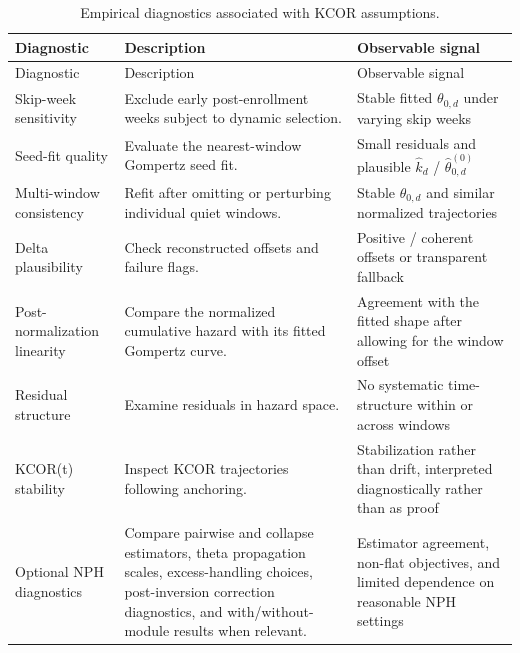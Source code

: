 \documentclass[
]{article}
\begin{document}
\begin{longtable}[]{@{}
  >{\raggedright\arraybackslash}p{}
  >{\raggedright\arraybackslash}p{}
  >{\raggedright\arraybackslash}p{}@{}}
\caption{Empirical diagnostics associated with KCOR assumptions.}\label{tbl:si_diagnostics}\tabularnewline
\toprule\noalign{}
\begin{minipage}[b]{\linewidth}\raggedright
Diagnostic
\end{minipage} & \begin{minipage}[b]{\linewidth}\raggedright
Description
\end{minipage} & \begin{minipage}[b]{\linewidth}\raggedright
Observable signal
\end{minipage} \\
\midrule\noalign{}
\endfirsthead
\toprule\noalign{}
\begin{minipage}[b]{\linewidth}\raggedright
Diagnostic
\end{minipage} & \begin{minipage}[b]{\linewidth}\raggedright
Description
\end{minipage} & \begin{minipage}[b]{\linewidth}\raggedright
Observable signal
\end{minipage} \\
\midrule\noalign{}
\endhead
\bottomrule\noalign{}
\endlastfoot
Skip-week sensitivity & Exclude early post-enrollment weeks subject to dynamic selection. & Stable fitted \(\theta_{0,d}\) under varying skip weeks \\
Seed-fit quality & Evaluate the nearest-window Gompertz seed fit. & Small residuals and plausible \(\hat{k}_d\) / \(\hat{\theta}_{0,d}^{(0)}\) \\
Multi-window consistency & Refit after omitting or perturbing individual quiet windows. & Stable \(\hat{\theta}_{0,d}\) and similar normalized trajectories \\
Delta plausibility & Check reconstructed offsets and failure flags. & Positive / coherent offsets or transparent fallback \\
Post-normalization linearity & Compare the normalized cumulative hazard with its fitted Gompertz curve. & Agreement with the fitted shape after allowing for the window offset \\
Residual structure & Examine residuals in hazard space. & No systematic time-structure within or across windows \\
KCOR(t) stability & Inspect KCOR trajectories following anchoring. & Stabilization rather than drift, interpreted diagnostically rather than as proof \\
Optional NPH diagnostics & Compare pairwise and collapse estimators, theta propagation scales, excess-handling choices, post-inversion correction diagnostics, and with/without-module results when relevant. & Estimator agreement, non-flat objectives, and limited dependence on reasonable NPH settings \\
\end{longtable}
\end{document}
